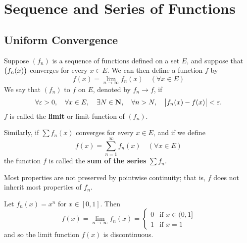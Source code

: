 \chapter{Sequence and Series of Functions}\label{chap:func-seq-series}
\section{Uniform Convergence}
\begin{definition}
Suppose $(f_n)$ is a sequence of functions defined on a set $E$, and suppose that $\left(f_n(x)\right)$ converges for every $x\in E$. We can then define a function $f$ by
\[f(x)=\lim_{n\to\infty}f_n(x)\quad(\forall x\in E)\]
We say that $(f_n)$  to $f$ on $E$, denoted by $f_n\to f$, if
\[\forall\varepsilon>0,\quad\forall x\in E,\quad\exists N\in\mathbf N,\quad\forall n>N,\quad\left|f_n(x)-f(x)\right|<\varepsilon.\]
$f$ is called the \textbf{limit} or limit function of $(f_n)$.

Similarly, if $\sum f_n(x)$ converges for every $x\in E$, and if we define
\[f(x)=\sum_{n=1}^\infty f_n(x)\quad(\forall x\in E)\]
the function $f$ is called the \textbf{sum of the series} $\sum f_n$.
\end{definition}

Most properties are not preserved by pointwise continuity; that is, $f$ does not inherit most properties of $f_n$.

\begin{example}
Let $f_n(x)=x^n$ for $x\in[0,1]$. Then
\[f(x)=\lim_{n\to\infty}f_n(x)=\begin{cases}
0&\text{if }x\in(0,1]\\
1&\text{if }x=1
\end{cases}\]
and so the limit function $f(x)$ is discontinuous.
\end{example}

